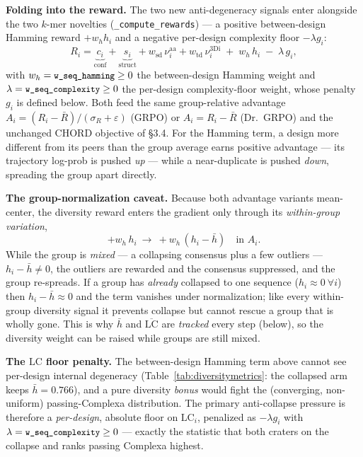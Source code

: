 \documentclass[11pt]{article}
\newcommand{\ttk}[1]{\texttt{\small #1}}
\begin{document}
\textbf{Folding into the reward.} The two new anti-degeneracy signals enter alongside the two $k$-mer
novelties (\ttk{\_compute\_rewards}) --- a positive between-design Hamming reward $+w_h h_i$ and a negative
per-design complexity floor $-\lambda g_i$:
\[
R_i=\underbrace{c_i}_{\text{conf}}+\underbrace{s_i}_{\text{struct}}
   +w_{\mathrm{sd}}\,\nu^{\mathrm{aa}}_i+w_{\mathrm{td}}\,\nu^{\mathrm{3Di}}_i
   \;+\;w_{h}\,h_i\;-\;\lambda\,g_i,
\]
with $w_h=\ttk{w\_seq\_hamming}\ge0$ the between-design Hamming weight and $\lambda=\ttk{w\_seq\_complexity}\ge0$
the per-design complexity-floor weight, whose penalty $g_i$ is defined below. Both feed the same
group-relative advantage $A_i=(R_i-\bar R)/(\sigma_R+\varepsilon)$ (GRPO) or $A_i=R_i-\bar R$ (Dr.\ GRPO)
and the unchanged CHORD objective of \S3.4. For the Hamming term, a design more different from its peers
than the group average earns positive advantage --- its trajectory log-prob is pushed \emph{up} --- while
a near-duplicate is pushed \emph{down}, spreading the group apart directly.

\textbf{The group-normalization caveat.} Because both advantage variants mean-center, the diversity
reward enters the gradient only through its \emph{within-group variation},
\[
+w_h\,h_i\ \longrightarrow\ +w_h\,(h_i-\bar h)\quad\text{in }A_i .
\]
While the group is \emph{mixed} --- a collapsing consensus plus a few outliers --- $h_i-\bar h\neq0$, the
outliers are rewarded and the consensus suppressed, and the group re-spreads. If a group has
\emph{already} collapsed to one sequence ($h_i\!\approx\!0\ \forall i$) then $h_i-\bar h\!\approx\!0$ and
the term vanishes under normalization; like every within-group diversity signal it prevents collapse but
cannot rescue a group that is wholly gone. This is why $\bar h$ and $\overline{\mathrm{LC}}$ are
\emph{tracked} every step (below), so the diversity weight can be raised while groups are still mixed.

\textbf{The $\mathrm{LC}$ floor penalty.} The between-design Hamming term above cannot see per-design
internal degeneracy (Table~\ref{tab:diversitymetrics}: the collapsed arm keeps $\bar h{=}0.766$), and a
pure diversity \emph{bonus} would fight the (converging, non-uniform) passing-Complexa distribution. The
primary anti-collapse pressure is therefore a \emph{per-design}, absolute floor on $\mathrm{LC}_i$,
penalized as $-\lambda g_i$ with $\lambda=\ttk{w\_seq\_complexity}\ge0$ --- exactly the statistic that both
craters on the collapse and ranks passing Complexa highest.
\end{document}
